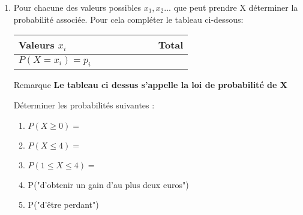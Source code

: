 \documentclass[10pt,a4paper]{article}
\theoremstyle{break}
\begin{document}
\begin{enumerate}
			\begin{itemize}
			\item Si la bille tirée est bleu elle gagne 3
			euros
			\item Si la bille tirée est verte elle  gagne
			un euro.
			\item Si la bille tirée est jaune elle perd 2 euros
		
		\end{itemize}
 Compléter la colonne gain ci-dessus.
 \\
	\begin{bclogo}[couleur = yellow!30, arrondi = 0.1,logo=\bcbook]{Remarque}
	 \textbf{A chaque issue, on associe donc un gain, on définit alors une variable aléatoire notée X.}
	 \end{bclogo}
	 Quelles sont les valeurs possibles que peut prendre X?\\
	 $X(\Omega)=\{....................................................\}$
	\item Pour chacune des valeurs possibles $x_1,x_2...$ que peut prendre X déterminer la probabilité associée.
	Pour cela compléter le tableau ci-dessous:\\
	\begin{center}
	
		\begin{tabular}{|C{3cm}|C{1cm}|C{1cm}|C{1cm}|C{1cm}|C{1cm}|C{1cm}|C{2cm}|}
				\hline
				Valeurs $x_i$ & & &  & & & &Total \\
				\hline
				$P(X=x_i)=p_i$&&&&&&& \\
				\hline
			\end{tabular}
			\begin{bclogo}[couleur = yellow!30, arrondi = 0.1,logo=\bcbook]{Remarque}
			\textbf{Le tableau ci dessus s'appelle la loi de probabilité de X}
		\end{bclogo}
			\end{center}
			Déterminer les probabilités suivantes :
			\begin{multicols}{2}
				\begin{enumerate}
					\item $P(X \geqslant 0)=$
					\item  $P(X \leqslant 4)=$
					\item  $P(1 \leqslant X \leqslant 4)=$
					\item P("d'obtenir un gain d'au plus deux euros")
					\item P("d'être perdant")
				\end{enumerate}
			\end{multicols}

\end{enumerate}
\end{document}
